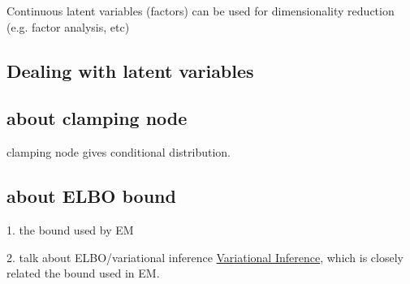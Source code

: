 Continuous latent variables (factors) can be used for dimensionality reduction (e.g. factor analysis, etc)
\subsection{Dealing with latent variables}
\subsection{about clamping node}
clamping node gives conditional distribution.

\subsection{about ELBO bound}
1. the bound used by EM

2. talk about ELBO/variational inference \href{https://media.nips.cc/Conferences/2016/Slides/6199-Slides.pdf}{Variational Inference}, which is closely related the bound used in EM.

